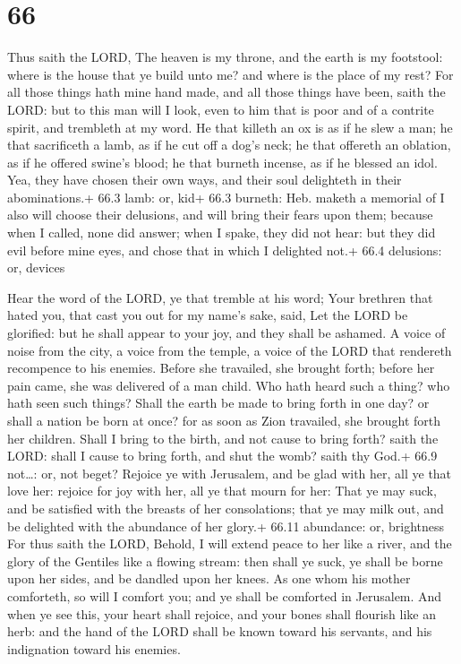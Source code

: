 \hypertarget{section-65}{%
\section{66}\label{section-65}}

 Thus saith the LORD, The heaven is my throne, and the earth
is my footstool: where is the house that ye build unto me? and where is
the place of my rest?  For all those things hath mine hand
made, and all those things have been, saith the LORD: but to this man
will I look, even to him that is poor and of a contrite spirit, and
trembleth at my word.  He that killeth an ox is as if he
slew a man; he that sacrificeth a lamb, as if he cut off a dog's neck;
he that offereth an oblation, as if he offered swine's blood; he that
burneth incense, as if he blessed an idol. Yea, they have chosen their
own ways, and their soul delighteth in their abominations.+ 66.3 lamb:
or, kid+ 66.3 burneth: Heb. maketh a memorial of  I also
will choose their delusions, and will bring their fears upon them;
because when I called, none did answer; when I spake, they did not hear:
but they did evil before mine eyes, and chose that in which I delighted
not.+ 66.4 delusions: or, devices

 Hear the word of the LORD, ye that tremble at his word;
Your brethren that hated you, that cast you out for my name's sake,
said, Let the LORD be glorified: but he shall appear to your joy, and
they shall be ashamed.  A voice of noise from the city, a
voice from the temple, a voice of the LORD that rendereth recompence to
his enemies.  Before she travailed, she brought forth;
before her pain came, she was delivered of a man child.  Who
hath heard such a thing? who hath seen such things? Shall the earth be
made to bring forth in one day? or shall a nation be born at once? for
as soon as Zion travailed, she brought forth her children. 
Shall I bring to the birth, and not cause to bring forth? saith the
LORD: shall I cause to bring forth, and shut the womb? saith thy God.+
66.9 not\ldots: or, not beget?  Rejoice ye with Jerusalem,
and be glad with her, all ye that love her: rejoice for joy with her,
all ye that mourn for her:  That ye may suck, and be
satisfied with the breasts of her consolations; that ye may milk out,
and be delighted with the abundance of her glory.+ 66.11 abundance: or,
brightness  For thus saith the LORD, Behold, I will extend
peace to her like a river, and the glory of the Gentiles like a flowing
stream: then shall ye suck, ye shall be borne upon her sides, and be
dandled upon her knees.  As one whom his mother comforteth,
so will I comfort you; and ye shall be comforted in Jerusalem.
 And when ye see this, your heart shall rejoice, and your
bones shall flourish like an herb: and the hand of the LORD shall be
known toward his servants, and his indignation toward his enemies.

